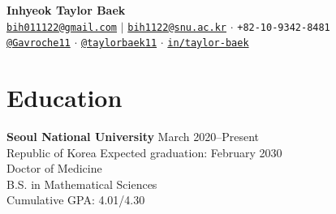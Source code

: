 \documentclass[10pt, a4paper]{article}
\begin{document}
\begin{center}
    {\Large\textbf{\color{mycolor}Inhyeok Taylor Baek}} \\[2mm]
    \small
    \faEnvelope\hspace{1mm}\href{mailto:bih011122@gmail.com}{\texttt{bih011122@gmail.com}} $\vert$ \href{mailto:bih1122@snu.ac.kr}{\texttt{bih1122@snu.ac.kr}}
    \hspace{2mm}$\cdot$\hspace{2mm}
    \faPhone\hspace{1mm}\texttt{+82-10-9342-8481} \\[1mm]
    \faGithub\hspace{1mm}\href{https://github.com/gavroche11}{\texttt{@Gavroche11}}
    \hspace{2mm}$\cdot$\hspace{2mm}
    {}\hspace{1mm}\href{https://x.com/taylorbaek11}{\texttt{@taylorbaek11}}
    \hspace{2mm}$\cdot$\hspace{2mm}
    \faLinkedin\hspace{1mm}\href{https://www.linkedin.com/in/taylor-baek/}{\texttt{in/taylor-baek}}
\end{center}

\section*{Education}
\textbf{Seoul National University} \hfill March 2020--Present \\
Republic of Korea \hfill Expected graduation: February 2030 \smallskip\\
Doctor of Medicine\\
B.S. in Mathematical Sciences \smallskip\\
Cumulative GPA: 4.01/4.30

\end{document}
